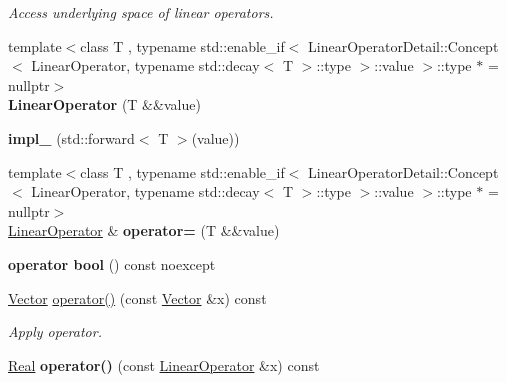 \begin{DoxyCompactItemize}
\begin{DoxyCompactList}\small\item\em \-Access underlying space of linear operators. \end{DoxyCompactList}\item 
\hypertarget{classSpacy_1_1LinearOperator_ac8c1647e64c14ce857def39e0148baed}{{\footnotesize template$<$class T , typename std\-::enable\-\_\-if$<$ Linear\-Operator\-Detail\-::\-Concept$<$ Linear\-Operator, typename std\-::decay$<$ T $>$\-::type $>$\-::value $>$\-::type $\ast$  = nullptr$>$ }\\{\bfseries \-Linear\-Operator} (\-T \&\&value)}\label{classSpacy_1_1LinearOperator_ac8c1647e64c14ce857def39e0148baed}

\item 
\hypertarget{classSpacy_1_1LinearOperator_a1ff1e3cfdad22ad6842bb6161dcf87a4}{{\bfseries impl\-\_\-} (std\-::forward$<$ \-T $>$(value))}\label{classSpacy_1_1LinearOperator_a1ff1e3cfdad22ad6842bb6161dcf87a4}

\item 
\hypertarget{classSpacy_1_1LinearOperator_a5028289a4b4b38067800ce0514ae34fc}{{\footnotesize template$<$class T , typename std\-::enable\-\_\-if$<$ Linear\-Operator\-Detail\-::\-Concept$<$ Linear\-Operator, typename std\-::decay$<$ T $>$\-::type $>$\-::value $>$\-::type $\ast$  = nullptr$>$ }\\\hyperlink{classSpacy_1_1LinearOperator}{\-Linear\-Operator} \& {\bfseries operator=} (\-T \&\&value)}\label{classSpacy_1_1LinearOperator_a5028289a4b4b38067800ce0514ae34fc}

\item 
\hypertarget{classSpacy_1_1LinearOperator_a48506fbca4e85aa239f80332cf6c37c1}{{\bfseries operator bool} () const noexcept}\label{classSpacy_1_1LinearOperator_a48506fbca4e85aa239f80332cf6c37c1}

\item 
\hypertarget{classSpacy_1_1LinearOperator_a54d74eb77e706ee2e087a0363929e946}{\hyperlink{classSpacy_1_1Vector}{\-Vector} \hyperlink{classSpacy_1_1LinearOperator_a54d74eb77e706ee2e087a0363929e946}{operator()} (const \hyperlink{classSpacy_1_1Vector}{\-Vector} \&x) const }\label{classSpacy_1_1LinearOperator_a54d74eb77e706ee2e087a0363929e946}

\begin{DoxyCompactList}\small\item\em \-Apply operator. \end{DoxyCompactList}\item 
\hypertarget{classSpacy_1_1LinearOperator_a75400dbcfa651fed1b37f58a8e722b90}{\hyperlink{classSpacy_1_1Real}{\-Real} {\bfseries operator()} (const \hyperlink{classSpacy_1_1LinearOperator}{\-Linear\-Operator} \&x) const }\label{classSpacy_1_1LinearOperator_a75400dbcfa651fed1b37f58a8e722b90}


\end{DoxyCompactItemize}
